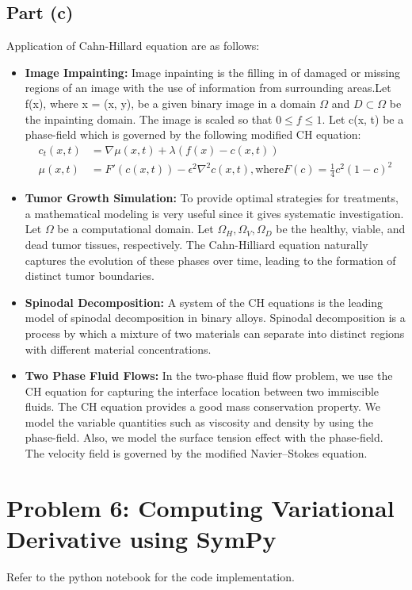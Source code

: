 \documentclass[12pt]{article}
\begin{document}
\subsection*{Part (c)}
Application of Cahn-Hillard equation are as follows:
\begin{itemize}
    \item \textbf{Image Impainting:} Image inpainting is the filling in of damaged or missing regions of an image with the use of information from surrounding areas.Let f(x), where x = (x, y), be a given binary image in a domain $\Omega$ and $D \subset \Omega$ be the inpainting domain. The image is scaled so that $0 \leq f \leq 1$. Let c(x, t) be a phase-field which is governed by the following modified CH equation:
    \begin{equation*}
        \begin{aligned}
            c_t(x, t) &= \nabla \mu (x, t) + \lambda(f(x)-c(x, t)) \\
            \mu(x, t) &= F' (c(x, t)) - \epsilon^2 \nabla^2 c(x, t), \text{where} F(c) = \frac{1}{4} c^2 (1-c)^2
        \end{aligned}
    \end{equation*} 
    \item \textbf{Tumor Growth Simulation:} To provide optimal strategies for treatments, a mathematical modeling is very useful since it gives systematic investigation. Let $\Omega$ be a computational domain. Let $\Omega_H, \Omega_V, \Omega_D$ be the healthy, viable, and dead tumor tissues, respectively. The Cahn-Hilliard equation naturally captures the evolution of these phases over time, leading to the formation of distinct tumor boundaries.
    \item \textbf{Spinodal Decomposition:} A system of the CH equations is the leading model of spinodal decomposition in binary alloys. Spinodal decomposition is a process by which a mixture of two materials can separate into distinct regions with different material concentrations.
    \item \textbf{Two Phase Fluid Flows:} In the two-phase fluid flow problem, we use the CH equation for capturing the interface location between two immiscible fluids. The CH equation provides a good mass conservation property. We model the variable quantities such as viscosity and density by using the phase-field. Also, we model the surface tension effect with the phase-field. The velocity field is governed by the modified Navier–Stokes equation.
\end{itemize}

\section*{Problem 6: Computing Variational Derivative using SymPy}
Refer to the python notebook for the code implementation.
\end{document}
